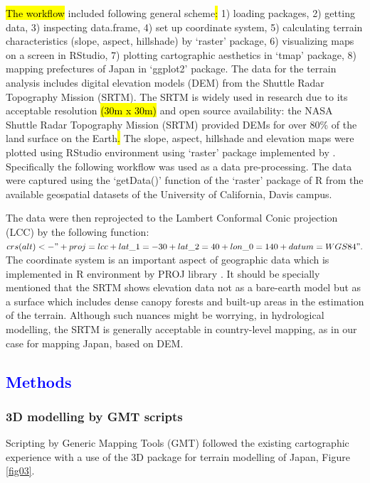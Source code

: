 \documentclass[land,article,submit,pdftex,moreauthors]{Definitions/mdpi}
\begin{document}
\hl{The workflow} included\hl{ }following general scheme\hl{: }1) loading packages, 2) getting data, 3) inspecting data.frame, 4) set up coordinate system, 5) calculating terrain characteristics (slope, aspect, hillshade) by ‘raster’ package, 6) visualizing maps on a screen in RStudio, 7) plotting cartographic aesthetics in ‘tmap’ package, 8) mapping prefectures of Japan in ‘ggplot2’ package. The data for the terrain analysis includes digital elevation models (DEM) from the Shuttle Radar Topography Mission (SRTM). The SRTM is widely used in research \cite{RABUS2003241} due to its acceptable resolution \hl{(30m x 30m)} and open source availability: the NASA Shuttle Radar Topography Mission (SRTM) provided DEMs for over 80\% of the land surface on the Earth\hl{. }The slope, aspect, hillshade and elevation maps were plotted using RStudio environment \cite{RStudio} using ‘raster’ package implemented by \cite{Hijmans}. Specifically the following workflow was used as a data pre-processing. The data were captured using the ‘getData()’ function of the ‘raster’ package of R from the available geospatial datasets of the University of California, Davis campus. 

The data were then reprojected to the Lambert Conformal Conic projection (LCC) by the following function: $crs(alt) <- "+proj=lcc +lat\_1=-30 +lat\_2=40 +lon\_0=140 +datum=WGS84".$ The coordinate system is an important aspect of geographic data which is implemented in R environment by PROJ library \cite{EversKnudsen}. It should be specially mentioned that the SRTM shows elevation data not as a bare-earth model but as a surface which includes dense canopy forests and built-up areas in the estimation of the terrain. Although such nuances might be worrying, in hydrological modelling, the SRTM is generally acceptable in country-level mapping, as in our case for mapping Japan, based on DEM.

\subsection{\textcolor{blue}{Methods}}

\subsubsection{3D modelling by GMT scripts}
Scripting by Generic Mapping Tools (GMT) followed the existing cartographic experience \cite{su142315966} with a use of the 3D package for terrain modelling of Japan, Figure \ref{fig03}. 
\end{document}
